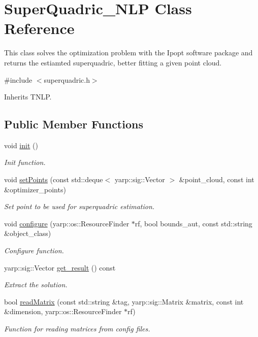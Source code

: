 \section{Super\+Quadric\+\_\+\+N\+LP Class Reference}
\label{classSuperQuadric__NLP}


This class solves the optimization problem with the Ipopt software package and returns the estiamted superquadric, better fitting a given point cloud.  




{\ttfamily \#include $<$superquadric.\+h$>$}



Inherits T\+N\+LP.

\subsection*{Public Member Functions}
\begin{DoxyCompactItemize}
\item 
\mbox{\label{classSuperQuadric__NLP_a7e39371548648a9b8d9673084ed5407d}} 
void \mbox{\hyperlink{classSuperQuadric__NLP_a7e39371548648a9b8d9673084ed5407d}{init}} ()
\begin{DoxyCompactList}\small\item\em Init function. \end{DoxyCompactList}\item 
void \mbox{\hyperlink{classSuperQuadric__NLP_a6895a29435328142fcb31a4827742fa6}{set\+Points}} (const std\+::deque$<$ yarp\+::sig\+::\+Vector $>$ \&point\+\_\+cloud, const int \&optimizer\+\_\+points)
\begin{DoxyCompactList}\small\item\em Set point to be used for superquadric estimation. \end{DoxyCompactList}\item 
void \mbox{\hyperlink{classSuperQuadric__NLP_aebc2844bb4fb3ff0399fc8fef8198229}{configure}} (yarp\+::os\+::\+Resource\+Finder $\ast$rf, bool bounds\+\_\+aut, const std\+::string \&object\+\_\+class)
\begin{DoxyCompactList}\small\item\em Configure function. \end{DoxyCompactList}\item 
yarp\+::sig\+::\+Vector \mbox{\hyperlink{classSuperQuadric__NLP_a5f32c9a6ef0483ddade880a15db7d417}{get\+\_\+result}} () const
\begin{DoxyCompactList}\small\item\em Extract the solution. \end{DoxyCompactList}\item 
bool \mbox{\hyperlink{classSuperQuadric__NLP_a964efe0e0fe66464238f99885c6323bf}{read\+Matrix}} (const std\+::string \&tag, yarp\+::sig\+::\+Matrix \&matrix, const int \&dimension, yarp\+::os\+::\+Resource\+Finder $\ast$rf)
\begin{DoxyCompactList}\small\item\em Function for reading matrices from config files. \end{DoxyCompactList}\end{DoxyCompactItemize}
